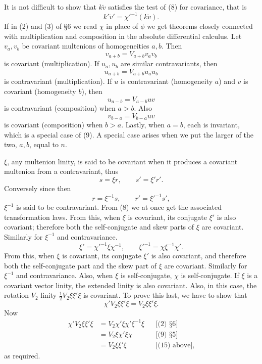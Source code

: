 \documentclass[11pt]{article}
\begin{document}
\indent It is not difficult to show that $k\breve v$ satisfies the test of (8) for covariance, that is
\[k'\breve v'=\chi'^{-1}(k\breve v).\]
If in (2) and (3) of §6 we read $\chi$ in place of $\phi$ we get theorems closely connected with multiplication and composition in the absolute differential calculus. Let $v_a,v_b$ be covariant multenions of homogeneities $a,b$. Then
\begin{equation}v_{a+b}=V_{a+b}v_av_b\tag{9}\end{equation}
is covariant (multiplication). If $u_a,u_b$ are similar contravariants, then
\begin{equation}u_{a+b}=V_{a+b}u_au_b\tag{10}\end{equation}
is contravariant (multiplication). If $u$ is contravariant (homogeneity $a$) and $v$ is covariant (homogeneity $b$), then
\begin{equation}u_{a-b}=V_{a-b}uv\tag{11}\end{equation}
is contravariant (composition) when $a>b$. Also
\begin{equation}v_{b-a}=V_{b-a}uv\tag{12}\end{equation}
is covariant (composition) when $b>a$. Lastly, when $a=b$, each is invariant, which is a special case of (9). A special case arises when we put the larger of the two, $a,b$, equal to $n$.

\indent $\xi$, any multenion linity, is said to be covariant when it produces a covariant multenion from a contravariant, thus
\begin{equation}s=\xi r,\qquad s'=\xi'r'.\tag{13}\end{equation}
Conversely since then
\begin{equation}r=\xi^{-1}s,\qquad r'=\xi'^{-1}s',\tag{14}\end{equation}
$\xi^{-1}$ is said to be contravariant. From (8) we at once get the associated transformation laws. From this, when $\xi$ is covariant, its conjugate $\xi'$ is also covariant; therefore both the self-conjugate and skew parts of $\xi$ are covariant. Similarly for $\xi^{-1}$ and contravariance.
\begin{equation}\xi'=\chi'^{-1}\xi\chi^{-1},\qquad \xi'^{-1}=\chi\xi^{-1}\chi'.\tag{15}\end{equation}
From this, when $\xi$ is covariant, its conjugate $\xi'$ is also covariant, and therefore both the self-conjugate part and the skew part of $\xi$ are covariant. Similarly for $\xi^{-1}$ and contravariance. Also, when $\xi$ is self-conjugate, $\chi$ is self-conjugate. If $\xi$ is a covariant vector linity, the extended linity is also covariant. Also, in this case, the rotation-$V_2$ linity $\tfrac12V_2\xi\xi'\xi$ is covariant. To prove this last, we have to show that
\[\chi'V_2\xi\xi'\xi=V_2\xi\xi'\xi.\]
Now
\[\begin{aligned}\chi'V_2\xi\xi'\xi&=V_2\chi'\xi\chi'\xi^{-1}\xi &&\text{[(2) §6]}\\&=V_2\xi\chi'\xi\chi &&\text{[(9) §5]}\\&=V_2\xi\xi'\xi &&\text{[(15) above],}\end{aligned}\]
as required.
\end{document}
